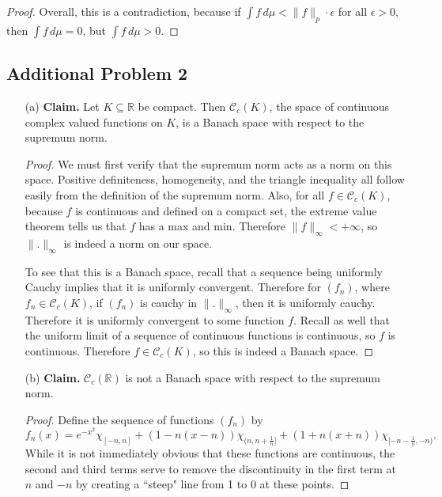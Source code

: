 \documentclass[12pt]{article}
\newcommand{\R}{\mathbb{R}}
\newcommand{\eq}[1]{\begin{equation*}#1\end{equation*}}
\begin{document}
\begin{itemize}
\begin{proof}
        Overall, this is a contradiction, because if $\int f \,d\mu < \|f\|_p \cdot \epsilon$ for all $\epsilon > 0$, then $\int f \,d\mu = 0$, but $\int f \,d\mu > 0$.
    \end{proof}
\end{itemize}

\subsection*{Additional Problem 2}

\begin{itemize}
    \item [(a)] \textbf{Claim. } Let $K \subseteq \R$ be compact. Then $\mathcal{C}_c(K)$, the space of continuous complex valued functions on $K$, is a Banach space with respect to the supremum norm.
    
    \begin{proof}
        We must first verify that the supremum norm acts as a norm on this space. Positive definiteness, homogeneity, and the triangle inequality all follow easily from the definition of the supremum norm. Also, for all $f \in \mathcal{C}_c(K)$, because $f$ is continuous and defined on a compact set, the extreme value theorem tells us that $f$ has a max and min. Therefore $\|f\|_\infty < +\infty$, so $\|.\|_\infty$ is indeed a norm on our space.

        To see that this is a Banach space, recall that a sequence being uniformly Cauchy implies that it is uniformly convergent. Therefore for $(f_n)$, where $f_n \in \mathcal{C}_c(K)$, if $(f_n)$ is cauchy in $\|.\|_\infty$, then it is uniformly cauchy. Therefore it is uniformly convergent to some function $f$. Recall as well that the uniform limit of a sequence of continuous functions is continuous, so $f$ is continuous. Therefore $f \in \mathcal{C}_c(K)$, so this is indeed a Banach space.
    \end{proof}

    \item [(b)] \textbf{Claim. } $\mathcal{C}_c(\R)$ is not a Banach space with respect to the supremum norm.
    
    \begin{proof}
        Define the sequence of functions $(f_n)$ by
        \eq{f_n(x) = e^{-x^2} \chi_{[-n, n]} + (1 - n(x - n))\chi_{(n, n+\frac{1}{n}]} + (1 + n(x + n))\chi_{[-n - \frac{1}{n}, -n)}.}
        While it is not immediately obvious that these functions are continuous, the second and third terms serve to remove the discontinuity in the first term at $n$ and $-n$ by creating a ``steep" line from 1 to 0 at these points.


\end{proof}
\end{itemize}
\end{document}
